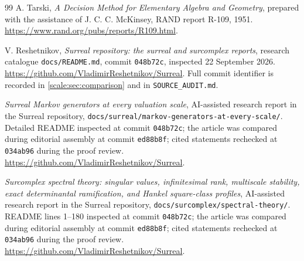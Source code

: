 \documentclass[11pt,a4paper]{article}
\numberwithin{equation}{section}
\theoremstyle{definition}
\newcommand{\shortpin}{048b72c}
\newcommand{\repo}{\url{https://github.com/VladimirReshetnikov/Surreal}}
\begin{document}
\begin{thebibliography}{99}
A. Tarski, \emph{A Decision Method for Elementary Algebra and Geometry},
prepared with the assistance of J. C. C. McKinsey,
RAND report R-109, 1951.
\url{https://www.rand.org/pubs/reports/R109.html}.

V. Reshetnikov, \emph{Surreal repository: the surreal and surcomplex
reports}, research catalogue \texttt{docs/README.md},
commit \texttt{\shortpin}, inspected 22 September 2026.
\repo. Full commit identifier is recorded in
\cref{scale:sec:comparison} and in \texttt{SOURCE\_AUDIT.md}.

\emph{Surreal Markov generators at every valuation scale},
AI-assisted research report in the Surreal repository,
\texttt{docs/surreal/markov-generators-at-every-scale/}.
Detailed README inspected at commit \texttt{\shortpin}; the article was
compared during editorial assembly at commit \texttt{ed88b8f}; cited
statements rechecked at \texttt{034ab96} during the proof review.
\repo.

\emph{Surcomplex spectral theory: singular values, infinitesimal rank,
multiscale stability, exact determinantal ramification, and Hankel
square-class profiles}, AI-assisted research report in the Surreal
repository, \texttt{docs/surcomplex/spectral-theory/}.
README lines 1--180 inspected at commit \texttt{\shortpin}; the article
was compared during editorial assembly at commit \texttt{ed88b8f}; cited
statements rechecked at \texttt{034ab96} during the proof review.
\repo.
\end{thebibliography}
\end{document}
